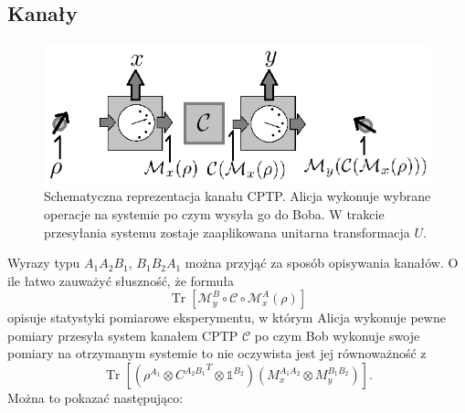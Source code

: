 \documentclass[10pt]{article} %
\DeclareMathOperator{\Trs}{Tr}
\newcommand{\I}{\mathbb{1}}
\begin{document}
\subsection{Kanały}
\begin{figure}[h]
\centering
\includegraphics{obrazki/channel_new}
\caption{Schematyczna reprezentacja kanału CPTP. Alicja wykonuje wybrane operacje na systemie po czym wysyła go do Boba. W trakcie przesyłania systemu zostaje zaaplikowana unitarna transformacja $U$.}
\end{figure}
Wyrazy typu $A_1A_2B_1$, $B_1B_2A_1$ można przyjąć za sposób opisywania kanałów. O ile łatwo zauważyć słuszność, że formuła
\begin{equation}
\Trs \left[ \mathcal{M}_y^B \circ \mathcal{C} \circ \mathcal{M}_x^A(\rho)\right]
\end{equation} opisuje statystyki pomiarowe eksperymentu, w którym Alicja wykonuje pewne pomiary przesyła system kanałem CPTP $\mathcal{C}$ po czym Bob wykonuje swoje pomiary na otrzymanym systemie to nie oczywista jest jej równoważność z 
\begin{equation}
\Trs \left[\left( \rho^{A_1}\otimes  {C^{A_2B_1}}^T \otimes \I^{B_2}\right)(M_x^{A_1A_2}\otimes M_y^{B_1B_2})\right].
\end{equation} Można to pokazać następująco: 
\end{document}
